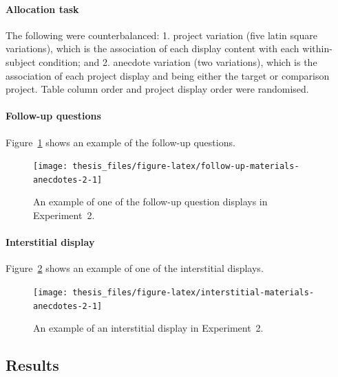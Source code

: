 \documentclass[a4paper, nobind, dvipsnames]{templates/ociamthesis}
\theoremstyle{definition}
\theoremstyle{definition}
\theoremstyle{definition}
\theoremstyle{definition}
\theoremstyle{remark}
\begin{document}
\hypertarget{allocation-anecdotes-2-appendix}{%
\paragraph{Allocation task}\label{allocation-anecdotes-2-appendix}}

The following were counterbalanced: 1. project variation (five latin square
variations), which is the association of each display content with each
within-subject condition; and 2. anecdote variation (two variations), which is
the association of each project display and being either the target or
comparison project. Table column order and project display order were
randomised.

\hypertarget{follow-up-materials-anecdotes-2}{%
\paragraph{Follow-up questions}\label{follow-up-materials-anecdotes-2}}

Figure~\ref{fig:follow-up-materials-anecdotes-2} shows an example of the
follow-up questions.



\begin{figure}
\texttt{[image: thesis\_files/figure-latex/follow-up-materials-anecdotes-2-1]} \caption{An example of one of the follow-up question displays in Experiment~2.}\label{fig:follow-up-materials-anecdotes-2}
\end{figure}

\hypertarget{interstitial-materials-anecdotes-2}{%
\paragraph{Interstitial display}\label{interstitial-materials-anecdotes-2}}

Figure~\ref{fig:interstitial-materials-anecdotes-2} shows an example of one of
the interstitial displays.



\begin{figure}
\texttt{[image: thesis\_files/figure-latex/interstitial-materials-anecdotes-2-1]} \caption{An example of an interstitial display in Experiment~2.}\label{fig:interstitial-materials-anecdotes-2}
\end{figure}

\hypertarget{results-anecdotes-2-appendix}{%
\subsection{Results}\label{results-anecdotes-2-appendix}}
\end{document}
